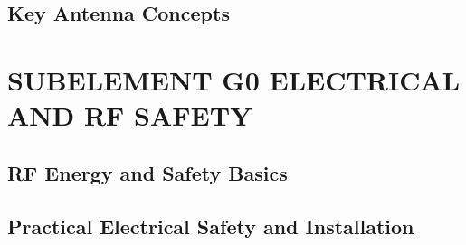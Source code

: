 \documentclass[12pt]{book}
\begin{document}
\section{Key Antenna Concepts}












\chapter{SUBELEMENT G0  ELECTRICAL AND RF SAFETY}
\section{RF Energy and Safety Basics}












\section{Practical Electrical Safety and Installation}













\end{document}
